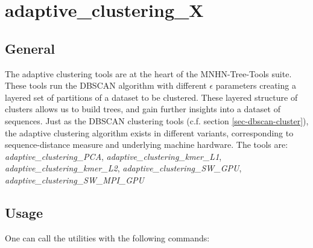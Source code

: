 \section{adaptive\_clustering\_X} \label{sec-adaptive-clust}

\subsection{General}
The adaptive clustering tools are at the heart of the MNHN-Tree-Tools suite.
These tools run the DBSCAN \cite{dbscan} algorithm with different
$\epsilon$ parameters creating a layered set of partitions of a
dataset to be clustered. 
These layered structure of clusters allows us to
build trees, and gain further insights into a dataset of
sequences. Just as the DBSCAN clustering tools (c.f. section
\ref{sec-dbscan-cluster}), the adaptive
clustering algorithm exists in different variants, corresponding to
sequence-distance measure and underlying machine hardware. The tools
are: \emph{adaptive\_clustering\_PCA}, \emph{adaptive\_clustering\_kmer\_L1},
\emph{adaptive\_clustering\_kmer\_L2}, \emph{adaptive\_clustering\_SW\_GPU},
\emph{adaptive\_clustering\_SW\_MPI\_GPU} 

\subsection{Usage}

One can call the utilities with the following commands: 

